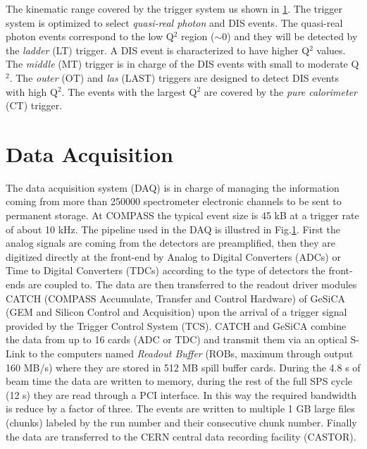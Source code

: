 The kinematic range covered by the trigger system us shown in \ref{}. The trigger system is optimized to select \textit{quasi-real photon} and DIS events. The quasi-real photon
 events correspond to the low Q$^2$ region ($\sim$0) and they will be detected by the \textit{ladder} (LT) trigger. A DIS event is characterized to have higher Q$^2$ values. The \textit{middle}
 (MT) trigger is in charge of the DIS events with small to moderate Q$^2$. The \textit{outer} (OT) and \textit{las} (LAST) triggers are designed to detect DIS events with high Q$^2$.
 The events with the largest Q$^2$ are covered by the \textit{pure calorimeter} (CT) trigger.


\section{Data Acquisition}

The data acquisition system (DAQ) \cite{} is in charge of managing the information coming from more than 250000 spectrometer electronic channels to be sent to permanent storage.
At COMPASS the typical event size is 45 kB at a trigger rate of about 10 kHz. The pipeline used in the DAQ is illustred in Fig.\ref{}. First the analog signals are coming from
the detectors are preamplified, then they are digitized directly at the front-end by Analog to Digital Converters (ADCs) or Time to Digital Converters (TDCs) according to the type
of detectors the front-ends are coupled to. The data are then transferred to the readout driver modules CATCH (COMPASS Accumulate, Transfer and Control Hardware) of GeSiCA (GEM and
Silicon Control and Acquisition) upon the arrival of a trigger signal provided by the Trigger Control System (TCS). CATCH and GeSiCA combine the data from up to 16 cards (ADC or TDC)
and transmit them via an optical S-Link to the computers named \textit{Readout Buffer} (ROBs, maximum through output 160 MB/s) where they are stored in 512 MB spill buffer cards.
During the 4.8 s of beam time the data are written to memory, during the rest of the full SPS cycle (12 s) they are read through a PCI interface. In this way the required bandwidth
is reduce by a factor of three. The events are written to multiple 1 GB large files (chunks) labeled by the run number and their consecutive chunk number. Finally the data are transferred
to the CERN central data recording facility (CASTOR).


